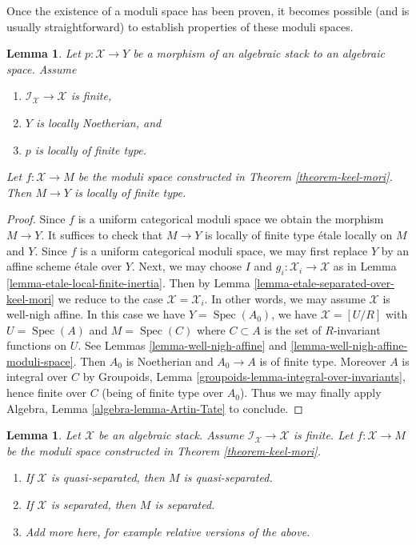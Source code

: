 \documentclass{stacks-project}
\theoremstyle{plain}
\newtheorem{lemma}[subsection]{Lemma}
\theoremstyle{definition}
\theoremstyle{remark}
\numberwithin{equation}{subsection}
\def\Spec{\mathop{\mathrm{Spec}}}
\begin{document}
\noindent
Once the existence of a moduli space has been proven,
it becomes possible (and is usually straightforward) to
establish properties of these moduli spaces.

\begin{lemma}
\label{lemma-keel-mori-finite-type}
Let $p : \mathcal{X} \to Y$ be a morphism of an algebraic stack to an
algebraic space. Assume
\begin{enumerate}
\item $\mathcal{I}_\mathcal{X} \to \mathcal{X}$ is finite,
\item $Y$ is locally Noetherian, and
\item $p$ is locally of finite type.
\end{enumerate}
Let $f : \mathcal{X} \to M$ be the moduli space constructed in
Theorem \ref{theorem-keel-mori}.
Then $M \to Y$ is locally of finite type.
\end{lemma}

\begin{proof}
Since $f$ is a uniform categorical moduli space we obtain the
morphism $M \to Y$. It suffices to check that $M \to Y$
is locally of finite type \'etale locally on $M$ and $Y$.
Since $f$ is a uniform categorical moduli space, we
may first replace $Y$ by an affine scheme \'etale over $Y$.
Next, we may choose $I$ and $g_i : \mathcal{X}_i \to \mathcal{X}$
as in Lemma \ref{lemma-etale-local-finite-inertia}.
Then by Lemma \ref{lemma-etale-separated-over-keel-mori}
we reduce to the case $\mathcal{X} = \mathcal{X}_i$.
In other words, we may assume $\mathcal{X}$ is well-nigh affine.
In this case we have $Y = \Spec(A_0)$, we have
$\mathcal{X} = [U/R]$ with $U = \Spec(A)$ and
$M = \Spec(C)$ where $C \subset A$ is the set of $R$-invariant
functions on $U$. See
Lemmas \ref{lemma-well-nigh-affine} and
\ref{lemma-well-nigh-affine-moduli-space}.
Then $A_0$ is Noetherian and $A_0 \to A$ is of finite type.
Moreover $A$ is integral over $C$ by
Groupoids, Lemma \ref{groupoids-lemma-integral-over-invariants},
hence finite over $C$
(being of finite type over $A_0$).
Thus we may finally apply
Algebra, Lemma \ref{algebra-lemma-Artin-Tate}
to conclude.
\end{proof}

\begin{lemma}
\label{lemma-keel-mori-diagonal}
Let $\mathcal{X}$ be an algebraic stack. Assume
$\mathcal{I}_\mathcal{X} \to \mathcal{X}$ is finite.
Let $f : \mathcal{X} \to M$ be the moduli space constructed in
Theorem \ref{theorem-keel-mori}.
\begin{enumerate}
\item If $\mathcal{X}$ is quasi-separated, then $M$ is quasi-separated.
\item If $\mathcal{X}$ is separated, then $M$ is separated.
\item Add more here, for example relative versions of the above.
\end{enumerate}
\end{lemma}
\end{document}
